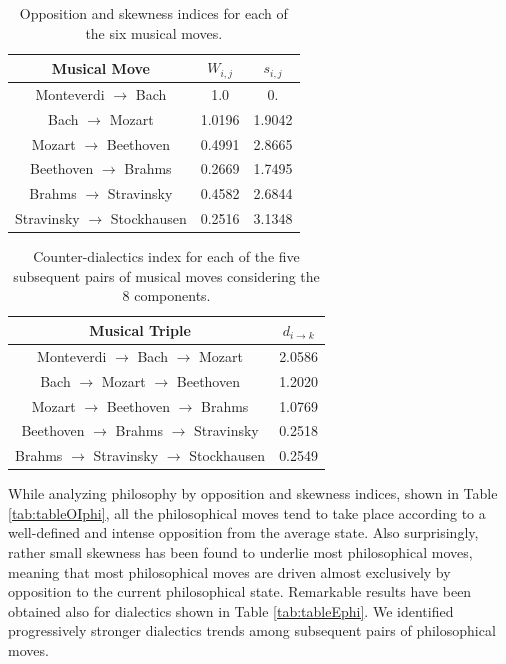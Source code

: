 \documentclass[
 aip,
 jmp,
 amsmath,amssymb,
 reprint,
]{revtex4-1}
\begin{document}
\begin{table}[ht]
\caption{\label{tab:tableOImus}Opposition and skewness indices for each
of the six musical moves.}
\begin{tabular}{|c||c|c|}
\hline
Musical Move & $W_{i,j}$ & $s_{i,j}$ \\
\hline \hline
 Monteverdi $\to$ Bach             &   1.0     &  0.      \\
 Bach $\to$ Mozart                 &   1.0196  &  1.9042  \\
 Mozart $\to$ Beethoven            &   0.4991  &  2.8665  \\
 Beethoven $\to$ Brahms            &   0.2669  &  1.7495  \\
 Brahms $\to$ Stravinsky           &   0.4582  &  2.6844  \\
 Stravinsky $\to$ Stockhausen      &   0.2516  &  3.1348  \\
\hline
\end{tabular}
\end{table}

\begin{table}[ht]
\caption{\label{tab:tableEmus} Counter-dialectics index for each
of the five subsequent pairs of musical moves considering the 8 components.}
\begin{tabular}{|c||c|}
\hline
Musical Triple & $d_{i \rightarrow k}$ \\
\hline \hline
 Monteverdi $\to$ Bach $\to$ Mozart          & 2.0586 \\
 Bach $\to$ Mozart $\to$ Beethoven           & 1.2020 \\
 Mozart $\to$ Beethoven $\to$ Brahms         & 1.0769 \\
 Beethoven $\to$ Brahms $\to$ Stravinsky     & 0.2518 \\
 Brahms $\to$ Stravinsky $\to$ Stockhausen   & 0.2549 \\
\hline
\end{tabular}
\end{table}

While analyzing philosophy by opposition and skewness indices, shown in Table \ref{tab:tableOIphi}, all the philosophical moves tend to take place according to a well-defined and intense opposition from the average state.  Also
surprisingly, rather small skewness has been found to underlie most
philosophical moves, meaning that most philosophical moves are driven
almost exclusively by opposition to the current philosophical state.
Remarkable results have been obtained also for dialectics shown in Table \ref{tab:tableEphi}.  We identified progressively stronger dialectics trends among subsequent pairs of philosophical moves.
\end{document}
